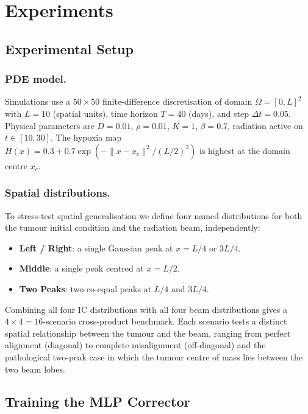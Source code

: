 \documentclass[runningheads]{llncs}
\begin{document}
\section{Experiments}
\label{sec:experiments}

\subsection{Experimental Setup}

\subsubsection{PDE model.}
Simulations use a $50 \times 50$ finite-difference discretisation of domain
$\Omega = [0, L]^2$ with $L = 10$ (spatial units), time horizon $T = 40$ (days),
and step $\Delta t = 0.05$.  Physical parameters are $D = 0.01$, $\rho = 0.01$,
$K = 1$, $\beta = 0.7$, radiation active on $t \in [10, 30]$.  The hypoxia map
$H(x) = 0.3 + 0.7\exp(-\|x - x_c\|^2/(L/2)^2)$ is highest at the domain centre
$x_c$.

\subsubsection{Spatial distributions.}
To stress-test spatial generalisation we define four named distributions for both
the tumour initial condition and the radiation beam, independently:

\begin{itemize}
    \item \textbf{Left / Right}: a single Gaussian peak at $x = L/4$ or $3L/4$.
    \item \textbf{Middle}: a single peak centred at $x = L/2$.
    \item \textbf{Two Peaks}: two co-equal peaks at $L/4$ and $3L/4$.
\end{itemize}

Combining all four IC distributions with all four beam distributions gives a
$4 \times 4 = 16$-scenario cross-product benchmark.  Each scenario tests a distinct
spatial relationship between the tumour and the beam, ranging from perfect alignment
(diagonal) to complete misalignment (off-diagonal) and the pathological two-peak case
in which the tumour centre of mass lies between the two beam lobes.

\subsection{Training the MLP Corrector}
\end{document}
